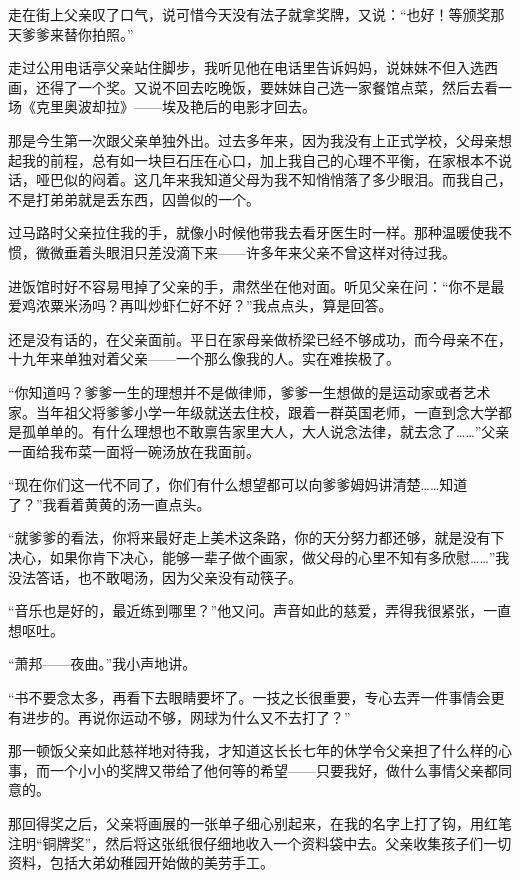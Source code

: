 \par 走在街上父亲叹了口气，说可惜今天没有法子就拿奖牌，又说：“也好！等颁奖那天爹爹来替你拍照。”
\par 走过公用电话亭父亲站住脚步，我听见他在电话里告诉妈妈，说妹妹不但入选西画，还得了一个奖。又说不回去吃晚饭，要妹妹自己选一家餐馆点菜，然后去看一场《克里奥波却拉》——埃及艳后的电影才回去。
\par 那是今生第一次跟父亲单独外出。过去多年来，因为我没有上正式学校，父母亲想起我的前程，总有如一块巨石压在心口，加上我自己的心理不平衡，在家根本不说话，哑巴似的闷着。这几年来我知道父母为我不知悄悄落了多少眼泪。而我自己，不是打弟弟就是丢东西，囚兽似的一个。
\par 过马路时父亲拉住我的手，就像小时候他带我去看牙医生时一样。那种温暖使我不惯，微微垂着头眼泪只差没滴下来——许多年来父亲不曾这样对待过我。
\par 进饭馆时好不容易甩掉了父亲的手，肃然坐在他对面。听见父亲在问：“你不是最爱鸡浓粟米汤吗？再叫炒虾仁好不好？”我点点头，算是回答。
\par 还是没有话的，在父亲面前。平日在家母亲做桥梁已经不够成功，而今母亲不在，十九年来单独对着父亲——一个那么像我的人。实在难挨极了。
\par “你知道吗？爹爹一生的理想并不是做律师，爹爹一生想做的是运动家或者艺术家。当年祖父将爹爹小学一年级就送去住校，跟着一群英国老师，一直到念大学都是孤单单的。有什么理想也不敢禀告家里大人，大人说念法律，就去念了……”父亲一面给我布菜一面将一碗汤放在我面前。
\par “现在你们这一代不同了，你们有什么想望都可以向爹爹姆妈讲清楚……知道了？”我看着黄黄的汤一直点头。
\par “就爹爹的看法，你将来最好走上美术这条路，你的天分努力都还够，就是没有下决心，如果你肯下决心，能够一辈子做个画家，做父母的心里不知有多欣慰……”我没法答话，也不敢喝汤，因为父亲没有动筷子。
\par “音乐也是好的，最近练到哪里？”他又问。声音如此的慈爱，弄得我很紧张，一直想呕吐。
\par “萧邦——夜曲。”我小声地讲。
\par “书不要念太多，再看下去眼睛要坏了。一技之长很重要，专心去弄一件事情会更有进步的。再说你运动不够，网球为什么又不去打了？”
\par 那一顿饭父亲如此慈祥地对待我，才知道这长长七年的休学令父亲担了什么样的心事，而一个小小的奖牌又带给了他何等的希望——只要我好，做什么事情父亲都同意的。
\par 那回得奖之后，父亲将画展的一张单子细心别起来，在我的名字上打了钩，用红笔注明“铜牌奖”，然后将这张纸很仔细地收入一个资料袋中去。父亲收集孩子们一切资料，包括大弟幼稚园开始做的美劳手工。

